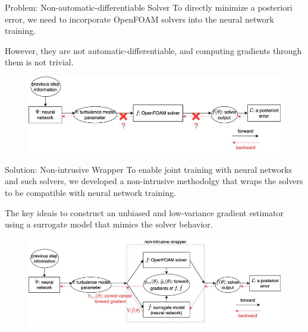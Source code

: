 \documentclass[paper slide]{beamer}
\begin{document}
\begin{frame}{Problem: Non-automatic-differentiable Solver}
    To directly minimize a posteriori error,
    we need to incorporate OpenFOAM solvers into the neural network training.
 
    However, they are not automatic-differentiable,
    and computing gradients through them is not trivial.
 
    \begin{figure}
        \includegraphics[width=\linewidth]{fig/of_problem.jpg}
    \end{figure}
    
\end{frame}
 
\begin{frame}{Solution: Non-intrusive Wrapper}
    To enable joint training with neural networks and such solvers,
    we developed a non-intrusive methodolgy that wraps the solvers
    to be compatible with neural network training.
 
    The key idea\footnotemark is to construct an unbiased and low-variance gradient estimator
    using a surrogate model that mimics the solver behavior.
 
    \begin{figure}
        \includegraphics[width=\linewidth]{fig/of_solution.jpg}
    \end{figure}
    
\end{frame}
\end{document}
